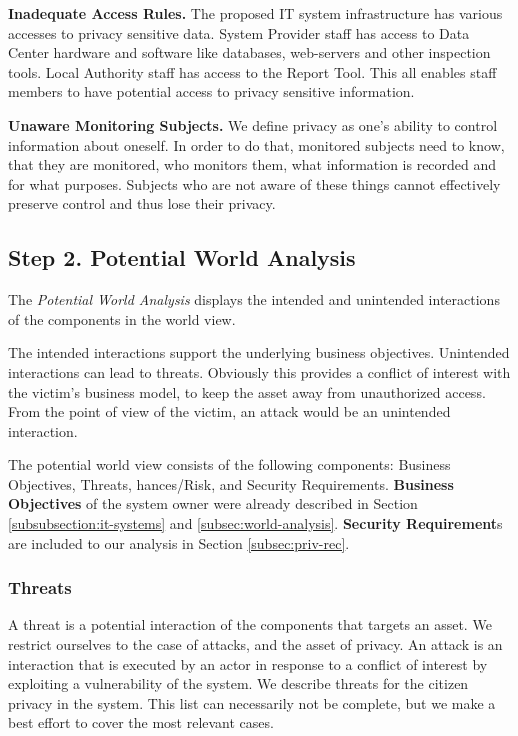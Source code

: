 \documentclass[runningheads,a4paper]{llncs}
\begin{document}
\textbf{Inadequate Access Rules.}
The proposed IT system infrastructure has various accesses to privacy sensitive data.
System Provider staff has access to Data Center hardware and software like databases, web-servers and other inspection tools. Local Authority staff has access to the Report Tool. This all enables staff members to have potential access to privacy sensitive information.


\textbf{Unaware Monitoring Subjects.}
We define privacy as one's ability to control information about
oneself.  In order to do that, monitored subjects need to know, that
they are monitored, who monitors them, what information is recorded
and for what purposes.  Subjects who are not aware of these things
cannot effectively preserve control and thus lose their privacy. 

\subsection{Step 2. Potential World Analysis}
\label{subsec:pot-analysis}

The \emph{Potential World Analysis} displays the intended and unintended interactions of the components in the world view.

The intended interactions support the underlying business objectives. Unintended interactions can lead to threats. Obviously this provides a conflict of interest with the victim's business model, to keep the asset away from unauthorized access. From the point of view of the victim, an attack would be an unintended interaction.

The potential world view consists of the following components: Business Objectives, Threats, hances/Risk, and Security Requirements. 
\textbf{Business Objectives} of the system owner were already described in Section \ref{subsubsection:it-systems} and \ref{subsec:world-analysis}. \textbf{Security Requirement}s are included to our analysis in Section \ref{subsec:priv-rec}.


\subsubsection{Threats}

A threat is a potential interaction of the components that targets an asset.
We restrict ourselves to the case of attacks, and the asset of privacy.
An attack is an interaction that is executed by an actor in response to a conflict of interest by exploiting a vulnerability of the system. We describe threats for the citizen privacy in the system.
This list can necessarily not be complete, but we make a best effort to cover the most relevant cases.
\end{document}
